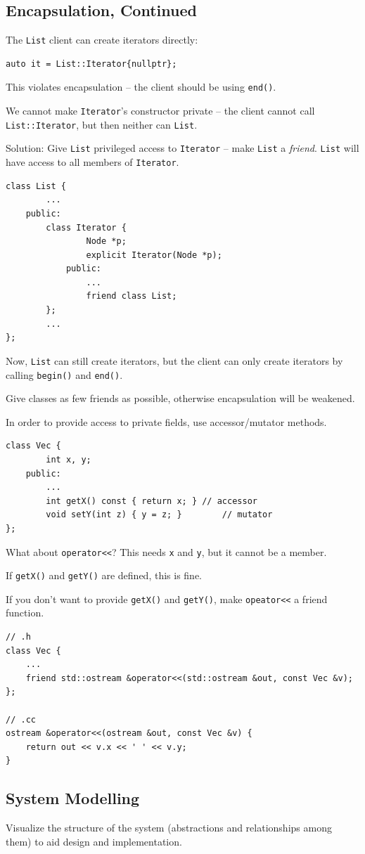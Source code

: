 \documentclass[11pt]{article}
\theoremstyle{definition}
\begin{document}
\subsection{Encapsulation, Continued}
The {\tt List} client can create iterators directly:
\begin{lstlisting}
auto it = List::Iterator{nullptr};
\end{lstlisting}
This violates encapsulation -- the client should be using {\tt end()}. 

We cannot make {\tt Iterator}'s constructor private -- the client cannot call {\tt List::Iterator}, but then neither can {\tt List}.

Solution: Give {\tt List} privileged access to {\tt Iterator} -- make {\tt List} a {\it friend}. {\tt List} will have access to all members of {\tt Iterator}.
\begin{lstlisting}
class List {
        ...
    public:
        class Iterator {
                Node *p;
                explicit Iterator(Node *p);
            public:
                ...
                friend class List; 
        };
        ...
};
\end{lstlisting}
Now, {\tt List} can still create iterators, but the client can only create iterators by calling {\tt begin()} and {\tt end()}.

Give classes as few friends as possible, otherwise encapsulation will be weakened.

In order to provide access to private fields, use accessor/mutator methods.
\begin{lstlisting}
class Vec {
        int x, y;
    public:
        ...
        int getX() const { return x; } // accessor
        void setY(int z) { y = z; }        // mutator
};
\end{lstlisting}
What about {\tt operator<\null<}? This needs {\tt x} and {\tt y}, but it cannot be a member.

If {\tt getX()} and {\tt getY()} are defined, this is fine.

If you don't want to provide {\tt getX()} and {\tt getY()}, make {\tt opeator<\null<} a friend function.
\begin{lstlisting}
// .h
class Vec {
    ...
    friend std::ostream &operator<<(std::ostream &out, const Vec &v);
};

// .cc
ostream &operator<<(ostream &out, const Vec &v) {
    return out << v.x << ' ' << v.y;
}
\end{lstlisting}

\newpage
\subsection{System Modelling}
Visualize the structure of the system (abstractions and relationships among them) to aid design and implementation.
\end{document}
